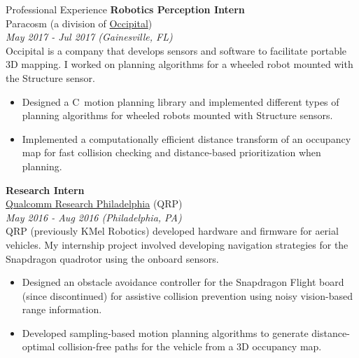 \documentclass[9pt]{article}
\newcommand \CPP {{C\nolinebreak[4]\hspace{-.05em}\raisebox{.4ex}{\tiny\bf ++}}}
\begin{document}
\begin{rsection}{Professional Experience}
    \textbf{Robotics Perception Intern} \\
    Paracosm (a division of \href{https://occipital.com/}{Occipital}) \\
    \textit{May 2017 - Jul 2017 (Gainesville, FL)} 
    \vspace{0.5em} \\
    Occipital is a company that develops sensors and software to facilitate portable 3D mapping. I worked on planning algorithms for a wheeled robot mounted with the Structure sensor.
    \begin{itemize}
        \item Designed a \CPP \ motion planning library and implemented different types of planning algorithms for wheeled robots mounted with Structure sensors.
        \item Implemented a computationally efficient distance transform of an occupancy map for fast collision checking and distance-based prioritization when planning.
    \end{itemize}
    
    \textbf{Research Intern} \\
    \href{https://www.qualcomm.com/research}{Qualcomm Research Philadelphia} (QRP) \\
    \textit{May 2016 - Aug 2016 (Philadelphia, PA)} 
    \vspace{0.5em} \\
    QRP (previously KMel Robotics) developed hardware and firmware for aerial vehicles. My internship project involved developing navigation strategies for the Snapdragon quadrotor using the onboard sensors.
    \begin{itemize}
        \item Designed an obstacle avoidance controller for the Snapdragon Flight board (since discontinued) for assistive collision prevention using noisy vision-based range information.
        \item Developed sampling-based motion planning algorithms to generate distance-optimal collision-free paths for the vehicle from a 3D occupancy map.
    \end{itemize}
\end{rsection}
\end{document}
